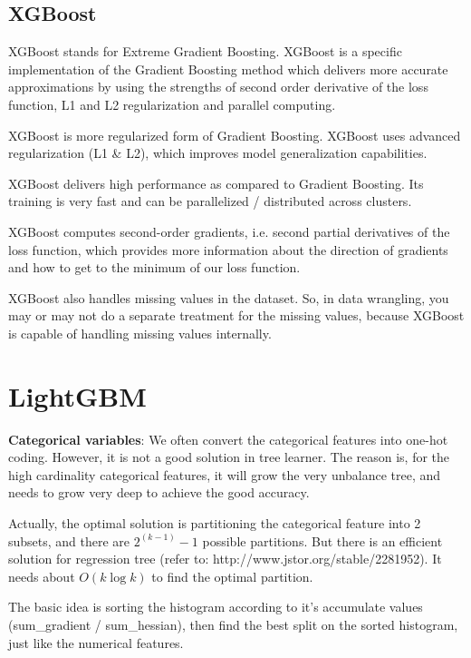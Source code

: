 \documentclass{article}
\begin{document}
\subsection{XGBoost}
XGBoost stands for Extreme Gradient Boosting. XGBoost is a specific implementation of the Gradient Boosting method which delivers more accurate approximations by using the strengths of second order derivative of the loss function, L1 and L2 regularization and parallel computing. 

XGBoost is more regularized form of Gradient Boosting. XGBoost uses advanced regularization (L1 \& L2), which improves model generalization capabilities.

XGBoost delivers high performance as compared to Gradient Boosting. Its training is very fast and can be parallelized / distributed across clusters.

XGBoost computes second-order gradients, i.e. second partial derivatives of the loss function, which provides more information about the direction of gradients and how to get to the minimum of our loss function.

XGBoost also handles missing values in the dataset. So, in data wrangling, you may or may not do a separate treatment for the missing values, because XGBoost is capable of handling missing values internally.

\section{LightGBM}

\textbf{Categorical variables}:
We often convert the categorical features into one-hot coding. However, it is not a good solution in tree learner. The reason is, for the high cardinality categorical features, it will grow the very unbalance tree, and needs to grow very deep to achieve the good accuracy.

Actually, the optimal solution is partitioning the categorical feature into 2 subsets, and there are $2^{(k-1)} - 1$ possible partitions. But there is an efficient solution for regression tree (refer to: http://www.jstor.org/stable/2281952). It needs about $O(k\log k)$ to find the optimal partition.

The basic idea is sorting the histogram according to it's accumulate values (sum\_gradient / sum\_hessian), then find the best split on the sorted histogram, just like the numerical features.
\end{document}
